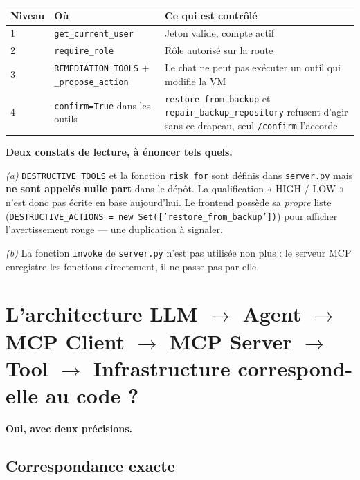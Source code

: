 \documentclass[11pt,a4paper]{report}
\newcommand{\file}[1]{\texttt{\small #1}}
\newcommand{\fn}[1]{\texttt{\small\textcolor{oasisviolet}{#1}}}
\newcommand{\route}[1]{\texttt{\small\textcolor{oasisgreen}{#1}}}
\newcommand{\arrowto}{\ensuremath{\rightarrow}}
\begin{document}
\begin{longtable}{@{}p{2.2cm}p{4.0cm}p{8.4cm}@{}}
\toprule
\textbf{Niveau} & \textbf{Où} & \textbf{Ce qui est contrôlé}\\
\midrule
\endhead
1 & \fn{get\_current\_user} & Jeton valide, compte actif\\
2 & \fn{require\_role} & Rôle autorisé sur la route\\
3 & \texttt{REMEDIATION\_TOOLS} + \fn{\_propose\_action} & Le chat ne peut pas exécuter un outil qui modifie la VM\\
4 & \texttt{confirm=True} dans les outils & \fn{restore\_from\_backup} et \fn{repair\_backup\_repository} refusent d'agir sans ce drapeau, seul \route{/confirm} l'accorde\\
\bottomrule
\end{longtable}

\begin{warnbox}
\textbf{Deux constats de lecture, à énoncer tels quels.}

\emph{(a)} \texttt{DESTRUCTIVE\_TOOLS} et la fonction \fn{risk\_for} sont
définis dans \file{server.py} mais \textbf{ne sont appelés nulle part} dans le
dépôt. La qualification « HIGH / LOW » n'est donc pas écrite en base
aujourd'hui. Le frontend possède sa \emph{propre} liste
(\texttt{DESTRUCTIVE\_ACTIONS = new Set(['restore\_from\_backup'])}) pour
afficher l'avertissement rouge --- une duplication à signaler.

\emph{(b)} La fonction \fn{invoke} de \file{server.py} n'est pas utilisée non
plus : le serveur MCP enregistre les fonctions directement, il ne passe pas par
elle.
\end{warnbox}

\section{L'architecture LLM \arrowto{} Agent \arrowto{} MCP Client \arrowto{} MCP Server \arrowto{} Tool \arrowto{} Infrastructure correspond-elle au code ?}

\textbf{Oui, avec deux précisions.}

\subsection*{Correspondance exacte}
\end{document}
